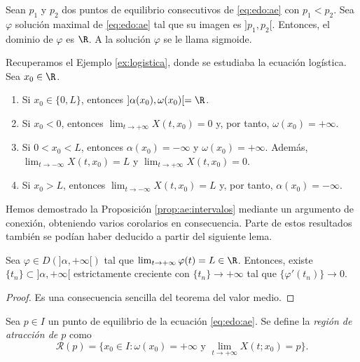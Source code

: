 \documentclass{article}
\begin{document}
\begin{cor}
  Sean $p_1$ y $p_2$ dos puntos de equilibrio consecutivos de \eqref{eq:edo:ae} con $p_1 < p_2$. Sea
  $\varphi$ solución maximal de \eqref{eq:edo:ae} tal que su imagen es $]p_1, p_2[$. Entonces, el
  dominio de $\varphi$ es $\R$. A la solución $\varphi$ se le llama sigmoide.
\end{cor}

\begin{ex} \label{ex:logistica:2} Recuperamos el Ejemplo \ref{ex:logistica},
  donde se estudiaba la ecuación logística. Sea $x_0 \in \R$.
  \begin{enumerate}
  \item Si $x_0 \in \{0, L\}$, entonces $]\alpha(x_0), \omega(x_0)[ = \R$.
  \item Si $x_0 < 0$, entonces $\lim_{t \to +\infty} X(t,x_0) = 0$ y, por tanto,
    $\omega(x_0) = +\infty$.
  \item Si $0 < x_0 < L$, entonces $\alpha(x_0) = -\infty$ y $\omega(x_0) = +\infty$. Además,
    $\lim_{t \to -\infty} X(t,x_0) = L$ y $\lim_{t \to +\infty} X(t,x_0) = 0$.
  \item Si $x_0 > L$, entonces $\lim_{t \to -\infty} X(t,x_0) = L$ y, por tanto,
    $\alpha(x_0) = -\infty$. \qedhere
  \end{enumerate}
\end{ex}

Hemos demostrado la Proposición \ref{prop:ae:intervalos} mediante un argumento de conexión,
obteniendo varios corolarios en consecuencia. Parte de estos resultados también se podían haber
deducido a partir del siguiente lema.

\begin{lemma}
  \label{lem:barbalet}
  Sea $\varphi \in D(]\alpha, +\infty[)$ tal que $\lim_{t \to +\infty} \varphi(t) = L \in
  \R$. Entonces, existe $\{t_n\} \subset ]\alpha, +\infty[$ estrictamente creciente con
  $\{t_n\} \to +\infty$ tal que $\{\varphi'(t_n)\} \to 0$.
\end{lemma}
\begin{proof}
  Es una consecuencia sencilla del teorema del valor medio.
\end{proof}

\begin{definition}
  \label{def:ra}
  Sea $p \in I$ un punto de equilibrio de la ecuación \eqref{eq:edo:ae}. Se define la \emph{región
    de atracción de $p$} como
  \[ \mathcal{R}(p) = \{x_0\in I: \omega(x_0) = +\infty \text{ y } \lim_{t \to +\infty} X(t;x_0) =
    p\}. \]
\end{definition}
\end{document}
